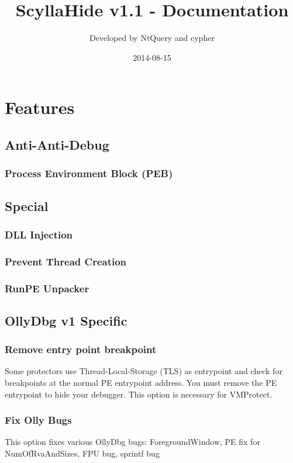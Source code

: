 \documentclass[10pt,a4paper]{article}
\title{ScyllaHide v1.1 - Documentation}
\author{Developed by NtQuery and cypher}
\date{2014-08-15}
\begin{document}
\maketitle
 
\tableofcontents

\newpage
{}

\section{Features}

\subsection{Anti-Anti-Debug}
\subsubsection{Process Environment Block (PEB)}
\subsection{Special}
\subsubsection{DLL Injection}
\subsubsection{Prevent Thread Creation}
\subsubsection{RunPE Unpacker}



\subsection{OllyDbg v1 Specific}
\subsubsection{Remove entry point breakpoint}
Some protectors use Thread-Local-Storage (TLS) as entrypoint and check for breakpoints at the normal PE entrypoint address. You must remove the PE entrypoint to hide your debugger. This option is necessary for VMProtect.
\subsubsection{Fix Olly Bugs}
This option fixes various OllyDbg bugs: ForegroundWindow, PE fix for NumOfRvaAndSizes, FPU bug, sprintf bug
\end{document}

